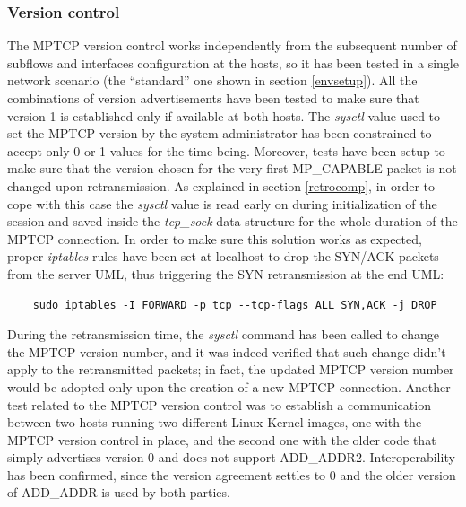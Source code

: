 \subsubsection{Version control}
The MPTCP version control works independently from the subsequent number of subflows and interfaces configuration at the hosts, so it has been tested in a single network scenario (the ``standard'' one shown in section \ref{envsetup}). All the combinations of version advertisements have been tested to make sure that version 1 is established only if available at both hosts. The \textit{sysctl} value used to set the MPTCP version by the system administrator has been constrained to accept only 0 or 1 values for the time being. Moreover, tests have been setup to make sure that the version chosen for the very first MP\_CAPABLE packet is not changed upon retransmission. As explained in section \ref{retrocomp}, in order to cope with this case the \textit{sysctl} value is read early on during initialization of the session and saved inside the \textit{tcp\_sock} data structure for the whole duration of the MPTCP connection. In order to make sure this solution works as expected, proper \textit{iptables} rules have been set at localhost to drop the SYN/ACK packets from the server UML, thus triggering the SYN retransmission at the end UML:

\begin{verbatim}
	sudo iptables -I FORWARD -p tcp --tcp-flags ALL SYN,ACK -j DROP
\end{verbatim}

During the retransmission time, the \textit{sysctl} command has been called to change the MPTCP version number, and it was indeed verified that such change didn't apply to the retransmitted packets; in fact, the updated MPTCP version number would be adopted only upon the creation of a new MPTCP connection.
Another test related to the MPTCP version control was to establish a communication between two hosts running two different Linux Kernel images, one with the MPTCP version control in place, and the second one with the older code that simply advertises version 0 and does not support ADD\_ADDR2. Interoperability has been confirmed, since the version agreement settles to 0 and the older version of ADD\_ADDR is used by both parties.

